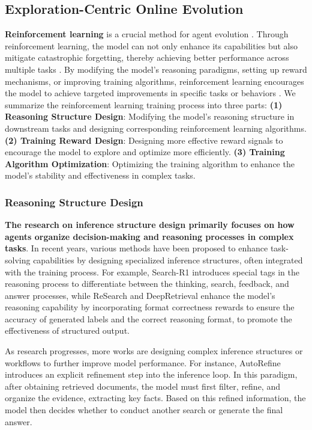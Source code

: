 \documentclass{llmxive}
\begin{document}
\subsection{Exploration-Centric Online Evolution}
\label{sec:agent_evo_reinforcement_learning_optimization}
\textbf{Reinforcement learning} is a crucial method for agent evolution \cite{PPO, GRPO, RLVE}. Through reinforcement learning, the model can not only enhance its capabilities but also mitigate catastrophic forgetting, thereby achieving better performance across multiple tasks \cite{SayCan, ReTool, GUI-R1, ARLArena, CM2, SimpleTIR, GEM, WebRL, WebArbiter}. By modifying the model's reasoning paradigms, setting up reward mechanisms, or improving training algorithms, reinforcement learning encourages the model to achieve targeted improvements in specific tasks or behaviors \cite{Agent-RRM, MetaClaw, ZeroGUI, DistRL}. We summarize the reinforcement learning training process into three parts: \textbf{(1) Reasoning Structure Design}: Modifying the model's reasoning structure in downstream tasks and designing corresponding reinforcement learning algorithms. \textbf{(2) Training Reward Design}: Designing more effective reward signals to encourage the model to explore and optimize more efficiently. \textbf{(3) Training Algorithm Optimization}: Optimizing the training algorithm to enhance the model's stability and effectiveness in complex tasks.

\subsubsection{Reasoning Structure Design}
\label{sec:reasoning_structure}
\textbf{The research on inference structure design primarily focuses on how agents organize decision-making and reasoning processes in complex tasks}. In recent years, various methods have been proposed to enhance task-solving capabilities by designing specialized inference structures, often integrated with the training process. For example, Search-R1 \cite{Search-r1} introduces special tags in the reasoning process to differentiate between the thinking, search, feedback, and answer processes, while ReSearch \cite{ReSearch_2} and DeepRetrieval \cite{Deepretrieval} enhance the model's reasoning capability by incorporating format correctness rewards to ensure the accuracy of generated labels and the correct reasoning format, to promote the effectiveness of structured output. 

As research progresses, more works are designing complex inference structures or workflows to further improve model performance. For instance, AutoRefine \cite{AutoRefine} introduces an explicit refinement step into the inference loop. In this paradigm, after obtaining retrieved documents, the model must first filter, refine, and organize the evidence, extracting key facts. Based on this refined information, the model then decides whether to conduct another search or generate the final answer.
\end{document}
